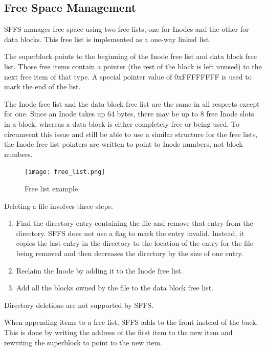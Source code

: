 \documentclass[10pt,twocolumn]{article}
\begin{document}
  \subsection{Free Space Management}
  SFFS manages free space using two free lists, one for Inodes and the other
  for data blocks. This free list is implemented as a one-way linked list.
  
  The superblock points to the beginning of the Inode free list and data block
  free list. Those free items contain a pointer (the rest of the block is 
  left unused) to the next free item of that type. A special pointer value of
  0xFFFFFFFF is used to mark the end of the list.

  The Inode free list and the data block free list are the same in all respects
  except for one. Since an Inode takes up 64 bytes, there may be up to 8 free
  Inode slots in a block, whereas a data block is either completely free or
  being used. To circumvent this issue and still be able to use a similar 
  structure for the free lists, the Inode free list pointers are written to 
  point to Inode numbers, not block numbers.

  \begin{figure}[h]
    \begin{center}
      \texttt{[image: free\_list.png]}
      \label{fig:directory_entry}
      \caption{Free list example.}
    \end{center}
  \end{figure}

  Deleting a file involves three steps:
  \begin{enumerate}
    \item Find the directory entry containing the file and
          remove that entry from the directory. SFFS does not use a flag to 
          mark the entry invalid. Instead, it copies the last entry in the 
          directory to the location of the entry for the file being removed and 
          then decreases the directory by the size of one entry.
    \item Reclaim the Inode by adding it to the Inode free list.
    \item Add all the blocks owned by the file to the data block free list.
  \end{enumerate}

  Directory deletions are not supported by SFFS.

  When appending items to a free list, SFFS adds to the front instead 
  of the back. This is done by writing the address of the first item to the
  new item and rewriting the superblock to point to the new item.
  
\end{document}

